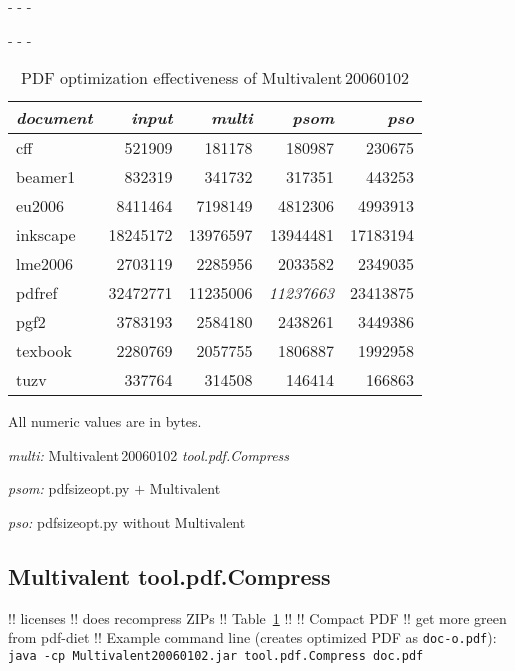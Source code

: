 \documentclass{ltugproc}
\def\cmd{\textsf}
\def\captiontop#1{%
  \advance\abovecaptionskip-\belowcaptionskip
  \advance\belowcaptionskip\abovecaptionskip
  \advance\abovecaptionskip-\belowcaptionskip
  \abovecaptionskip-\abovecaptionskip
  \caption{#1}%
  \advance\abovecaptionskip-\belowcaptionskip
  \advance\belowcaptionskip\abovecaptionskip
  \advance\abovecaptionskip-\belowcaptionskip
  \abovecaptionskip-\abovecaptionskip
}
\begin{document}
\begin{table}
\captiontop{PDF optimization effectiveness
of Multivalent\,20060102}\label{tab:eff-multivalent}
\par\small\noindent\hfil
\advance\tabcolsep-2pt  %
\begin{tabular*}{\hsize}{@{\extracolsep{\fill}}lrrrr@{}}
\toprule
\emph{document} & \emph{input} & \emph{multi} & \emph{psom} & \emph{pso} \\\midrule
cff         &   521909 &    181178 &    180987 &   230675 \\
beamer1     &   832319 &    341732 &    317351 &   443253 \\
eu2006      &  8411464 &   7198149 &   4812306 &  4993913 \\
inkscape    & 18245172 &  13976597 &  13944481 & 17183194 \\
lme2006     &  2703119 &   2285956 &   2033582 &  2349035 \\
pdfref      & 32472771 &  11235006 &  \emph{11237663} & 23413875 \\
pgf2        &  3783193 &   2584180 &   2438261 &  3449386 \\
texbook     &  2280769 &   2057755 &   1806887 &  1992958 \\
tuzv        &   337764 &    314508 &    146414 &   166863 \\
\bottomrule
\end{tabular*}
\par\bigskip
\par\noindent All numeric values are in bytes.
\par\noindent\emph{multi:} Multivalent\,20060102 \emph{tool.pdf.Compress}
\par\noindent\emph{psom:} \cmd{pdfsizeopt.py} $+$ Multivalent
\par\noindent\emph{pso:} \cmd{pdfsizeopt.py} without Multivalent
\end{table}

\subsection{Multivalent tool.pdf.Compress}

!! licenses
!! does recompress ZIPs
!! Table~\ref{tab:eff-multivalent}
!! \cite{pdf-diet}
!! Compact PDF
!! get more green from pdf-diet
!! Example command line (creates optimized PDF as \texttt{doc-o.pdf}):
\texttt{java -cp Multivalent20060102.jar tool.pdf.Compress doc.pdf}
\end{document}
